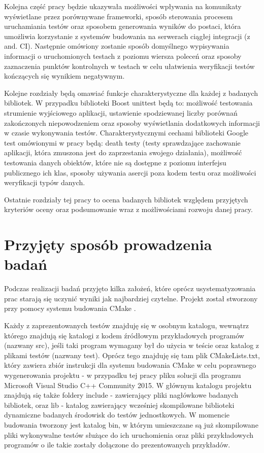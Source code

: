 \documentclass[12pt,a4paper,notitlepage]{report}
\begin{document}
Kolejna część pracy będzie ukazywała możliwości wpływania na komunikaty wyświetlane przez porównywane frameworki, sposób sterowania procesem uruchamiania testów oraz sposobem generowania wyników do postaci, która umożliwia korzystanie z systemów budowania na serwerach ciągłej integracji (z and. CI). Następnie omówiony zostanie sposób domyślnego wypisywania informacji o uruchomionych testach z poziomu wiersza poleceń oraz sposoby zaznaczenia punktów kontrolnych w testach w celu ułatwienia weryfikacji testów kończących się wynikiem negatywnym.

Kolejne rozdziały będą omawiać funkcje charakterystyczne dla każdej z badanych bibliotek. W przypadku biblioteki Boost unittest będą to: możliwość testowania strumienie wyjściowego aplikacji, ustawienie spodziewanej liczby porównań zakończonych niepowodzeniem oraz sposoby wyświetlania dodatkowych informacji w czasie wykonywania testów. Charakterystycznymi cechami biblioteki Google test omówionymi w pracy będą: death testy (testy sprawdzające zachowanie aplikacji, która zmuszona jest do zaprzestania swojego działania), możliwość testowania danych obiektów, które nie są dostępne z poziomu interfejsu publicznego ich klas, sposoby używania asercji poza kodem testu oraz możliwości weryfikacji typów danych.

Ostatnie rozdziały tej pracy to ocena badanych bibliotek względem przyjętych kryteriów oceny oraz podsumowanie wraz z możliwościami rozwoju danej pracy.

\chapter{Przyjęty sposób prowadzenia badań}

Podczas realizacji badań przyjęto kilka założeń, które oprócz usystematyzowania prac starają się uczynić wyniki jak najbardziej czytelne. Projekt został stworzony przy pomocy systemu budowania CMake \cite{cmake}.

Każdy z zaprezentowanych testów znajduję się w osobnym katalogu, wewnątrz którego znajdują się katalogi z kodem źródłowym przykładowych programów (nazwany src), jeśli taki program wymagany był do użycia w teście oraz katalog z plikami testów (nazwany test). Oprócz tego znajduję się tam plik CMakeLists.txt, który zawiera zbiór instrukcji dla systemu budowania CMake w celu poprawnego wygenerowania projektu - w przypadku tej pracy pliku solucji dla programu Microsoft Visual Studio C++ Community 2015. W głównym katalogu projektu znajdują się także foldery include - zawierający pliki nagłówkowe badanych bibliotek, oraz lib - katalog zawierający wcześniej skompilowane biblioteki dynamiczne badanych środowisk do testów jednostkowych. W momencie budowania tworzony jest katalog bin, w którym umieszczane są już skompilowane pliki wykonywalne testów służące do ich uruchomienia oraz pliki przykładowych programów o ile takie zostały dołączone do prezentowanych przykładów.
\end{document}
